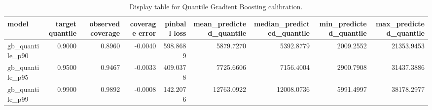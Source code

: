 \begin{table}
\caption{Display table for Quantile Gradient Boosting calibration.}
\label{tab:08-quantile-results-display}
\begin{tabular}{lrrrrrrrr}
\toprule
model & target quantile & observed coverage & coverage error & pinball loss & mean_predicted_quantile & median_predicted_quantile & min_predicted_quantile & max_predicted_quantile \\
\midrule
gb_quantile_p90 & 0.9000 & 0.8960 & -0.0040 & 598.8689 & 5879.7270 & 5392.8779 & 2009.2552 & 21353.9453 \\
gb_quantile_p95 & 0.9500 & 0.9467 & -0.0033 & 409.0378 & 7725.6606 & 7156.4004 & 2900.7908 & 31437.3886 \\
gb_quantile_p99 & 0.9900 & 0.9892 & -0.0008 & 142.2076 & 12763.0922 & 12008.0736 & 5991.4997 & 38178.2977 \\
\bottomrule
\end{tabular}
\end{table}
